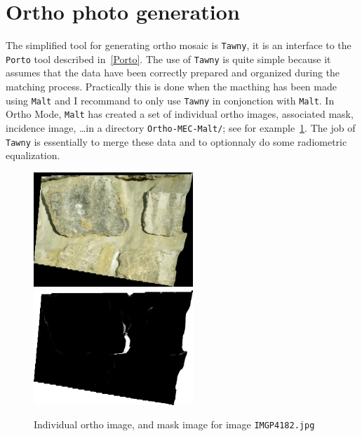 
\section{Ortho photo generation}

The simplified tool for generating ortho mosaic is {\tt Tawny}, it is
an interface to the {\tt Porto} tool described in~\ref{Porto}. 
The use of {\tt Tawny} is quite simple because it assumes that
the data have been correctly prepared and organized during the matching
process. Practically this is done when the macthing has been made using 
{\tt Malt} and I recommand to only use {\tt Tawny}  in conjonction with
{\tt Malt}. In Ortho Mode, {\tt Malt} has created a set of
individual ortho images, associated mask, incidence image, \dots in
a directory {\tt Ortho-MEC-Malt/}; see for example~\ref{FIG:Malt:Input}. 
 The job of {\tt Tawny} is essentially to merge these data and to optionnaly do some
radiometric equalization.



\begin{figure}
\begin{center}
\includegraphics[width=60mm]{FIGS/MurSaintMartin/Ort_IMGP4182.jpg}
\includegraphics[width=60mm]{FIGS/MurSaintMartin/PC_IMGP4182.jpg}
\end{center}
\caption{Individual ortho image, and mask image for image {\tt IMGP4182.jpg}}
\label{FIG:Malt:Input}
\end{figure}





